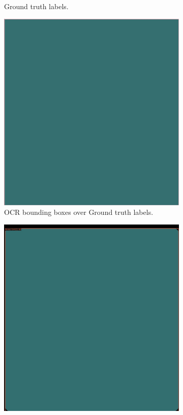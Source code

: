 \documentclass[oneside, english, bibtex]{kththesis}
\begin{document}
\begin{figure}[!htb]
\begin{adjustbox}{center}
{\begin{subfigure}{0.75\textwidth}
  \caption{Ground truth labels.}
  \label{fig:1RoKim0_GT}
\end{subfigure}
\begin{subfigure}{0.75\textwidth}
  \centering
\includegraphics[width=\linewidth]{figures/ocr_bbox/1RoKim0.jpg}
  \caption{OCR bounding boxes over Ground truth labels.}
  \label{fig:1RoKim0_GTbb}
\end{subfigure}
\begin{subfigure}{0.75\textwidth}
  \centering
\includegraphics[width=\linewidth]{figures/labels-vanilla-0.75/1RoKim0.jpg}

\end{subfigure}}
\end{adjustbox}
\end{figure}
\end{document}
